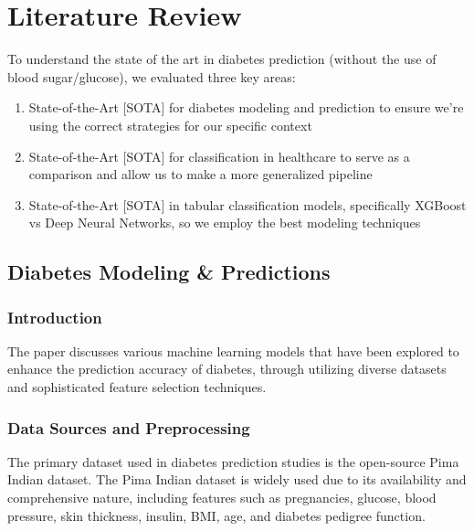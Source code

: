 \documentclass[conference]{IEEEtran}
\begin{document}
\section{Literature Review}\label{sec:litreview}
To understand the state of the art in diabetes prediction (without the use of blood sugar/glucose), we evaluated three key areas:

    \begin{enumerate}
        \item State-of-the-Art [SOTA] for diabetes modeling and prediction to ensure we're using the correct strategies for our specific context
        \item State-of-the-Art [SOTA] for classification in healthcare to serve as a comparison and allow us to make a more generalized pipeline
        \item State-of-the-Art [SOTA] in tabular classification models, specifically XGBoost vs Deep Neural Networks, so we employ the best modeling techniques
    \end{enumerate}

\subsection{Diabetes Modeling \& Predictions }

\subsubsection{Introduction}
The paper\cite{b5} discusses various machine learning models that have been explored to enhance the prediction accuracy of diabetes, through utilizing diverse datasets and sophisticated feature selection techniques.

\subsubsection{Data Sources and Preprocessing}
The primary dataset used in diabetes prediction studies is the open-source Pima Indian dataset. The Pima Indian dataset is widely used due to its availability and comprehensive nature, including features such as pregnancies, glucose, blood pressure, skin thickness, insulin, BMI, age, and diabetes pedigree function. 
\end{document}
